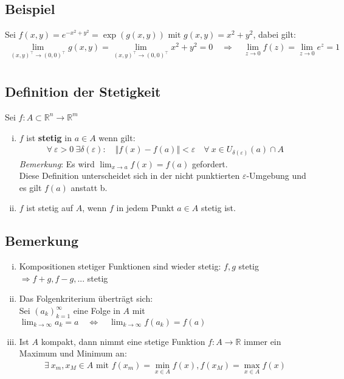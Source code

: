 \documentclass[11pt,a4paper]{book}
\newcommand {\R}	{\mathbb{R}}
\newcommand {\Rn}	{\mathbb{R}^n}
\newcommand {\Rm}	{\mathbb{R}^m}
\newcommand{\1}    	{\mathbbm{1}}
\newcommand{\mitt}	{\textrm{ mit }}
\begin{document}
\subsection{Beispiel}
Sei \(f(x,y) = e^{-x^2 + y^2} = \exp\left( g(x,y) \right) \mitt g(x,y) = x^2 + y^2\), dabei gilt:
\begin{align*}
	\lim_{(x,y)^\top \rightarrow (0,0)^\top} g(x,y) = \lim_{(x,y)^\top \rightarrow (0,0)^\top} x^2 + y^2 = 0
	\quad \Rightarrow \quad \lim_{z \rightarrow 0} f(z) = \lim_{z \rightarrow 0} e^z = 1 \\
\end{align*}

\subsection{Definition der Stetigkeit}
Sei \(f: A \subset \Rn \rightarrow \Rm\)
\begin{enumerate}[(i)]
	\item \(f\) ist \textbf{stetig} in \(a \in A\) wenn gilt:
	\begin{align*}
		\forall~ \varepsilon > 0 ~ \exists \delta(\varepsilon) : \quad \Vert f(x) - f(a) \Vert < \varepsilon \quad \forall~ x \in U_{\delta(\varepsilon)}(a) \cap A
	\end{align*}
	\textit{Bemerkung}: Es wird \( \lim_{x \rightarrow a} f(x) = f(a) \) gefordert. \\
	Diese Definition unterscheidet sich in der nicht punktierten \(\varepsilon\)-Umgebung und es gilt \(f(a)\) anstatt b.
	\item \(f\) ist stetig auf \(A\), wenn \(f\) in jedem Punkt \(a \in A\) stetig ist.
\end{enumerate}

\subsection{Bemerkung}
\begin{enumerate}[(i)]
	\item Kompositionen stetiger Funktionen sind wieder stetig: \(f, g\) stetig \(\Rightarrow f+g, f-g, ...\) stetig
	\item Das Folgenkriterium überträgt sich: \\
	Sei \((a_k)_{k=1}^\infty \) eine Folge in \(A\) mit \(\lim_{k \rightarrow \infty} a_k = a  \quad \Leftrightarrow \quad \lim_{k \rightarrow \infty} f(a_k) = f(a)\)
	\item Ist \(A\) kompakt, dann nimmt eine stetige Funktion \(f : A \rightarrow \R\) immer ein Maximum und Minimum an:
	\begin{align*}
		\exists~ x_m, x_M \in A \mitt f(x_m) = \min_{x \in A} f(x), f(x_M) = \max_{x \in A} f(x)
	\end{align*}
\end{enumerate}
\end{document}
